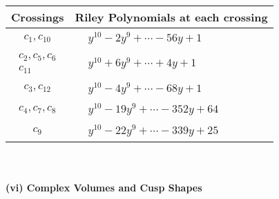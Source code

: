 \documentclass[1p]{elsarticle_modified}
\theoremstyle{definition}
\begin{document}
\begin{tabular}{m{50pt}|m{274pt}}
Crossings & \hspace{64pt}Riley Polynomials at each crossing \\
\hline $$\begin{aligned}c_{1},c_{10}\end{aligned}$$&$\begin{aligned}
&y^{10}-2 y^9+\cdots-56 y+1
\end{aligned}$\\
\hline $$\begin{aligned}c_{2},c_{5},c_{6}\\c_{11}\end{aligned}$$&$\begin{aligned}
&y^{10}+6 y^9+\cdots+4 y+1
\end{aligned}$\\
\hline $$\begin{aligned}c_{3},c_{12}\end{aligned}$$&$\begin{aligned}
&y^{10}-4 y^9+\cdots-68 y+1
\end{aligned}$\\
\hline $$\begin{aligned}c_{4},c_{7},c_{8}\end{aligned}$$&$\begin{aligned}
&y^{10}-19 y^9+\cdots-352 y+64
\end{aligned}$\\
\hline $$\begin{aligned}c_{9}\end{aligned}$$&$\begin{aligned}
&y^{10}-22 y^9+\cdots-339 y+25
\end{aligned}$\\
\hline
\end{tabular}\\~\\
\newpage\flushleft \textbf{(vi) Complex Volumes and Cusp Shapes}
\end{document}

